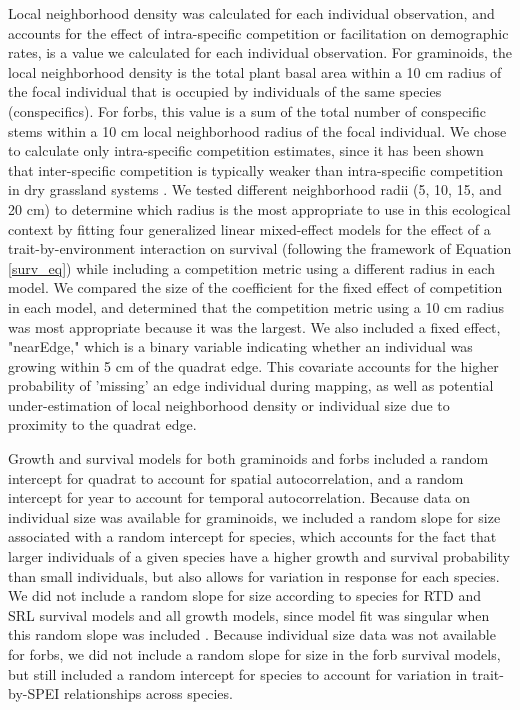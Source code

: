 \documentclass[12pt, letterpaper]{article}
\begin{document}
Local neighborhood density was calculated for each individual observation, and accounts for the effect of intra-specific competition or facilitation on demographic rates, is a value we calculated for each individual observation. For graminoids, the local neighborhood density is the total plant basal area within a 10 cm radius of the focal individual that is occupied by individuals of the same species (conspecifics). For forbs, this value is a sum of the total number of conspecific stems within a 10 cm local neighborhood radius of the focal individual. We chose to calculate only intra-specific competition estimates, since it has been shown that inter-specific competition is typically weaker than intra-specific competition in dry grassland systems \citep{Adler2018,Laughlin2018}.  We tested different neighborhood radii (5, 10, 15, and 20 cm) to determine which radius is the most appropriate to use in this ecological context by fitting four generalized linear mixed-effect models for the effect of a trait-by-environment interaction on survival (following the framework of Equation \ref{surv_eq}) while including a competition metric using a different radius in each model. We compared the size of the coefficient for the fixed effect of competition in each model, and determined that the competition metric using a 10 cm radius was most appropriate because it was the largest.  We also included a fixed effect, "nearEdge," which is a binary variable indicating whether an individual was growing within 5 cm of the quadrat edge. This covariate accounts for the higher probability of 'missing' an edge individual during mapping, as well as potential under-estimation of local neighborhood density or individual size due to proximity to the quadrat edge. 

Growth and survival models for both graminoids and forbs included a random intercept for quadrat to account for spatial autocorrelation, and a random intercept for year to account for temporal autocorrelation. Because data on individual size was available for graminoids, we included a random slope for size associated with a random intercept for species, which accounts for the fact that larger individuals of a given species have a higher growth and survival probability than small individuals, but also allows for variation in response for each species. We did not include a random slope for size according to species for RTD and SRL survival models and all growth models, since model fit was singular when this random slope was included \citep{Bates2015}. Because individual size data was not available for forbs, we did not include a random slope for size in the forb survival models, but still included a random intercept for species to account for variation in trait-by-SPEI relationships across species.
\end{document}
